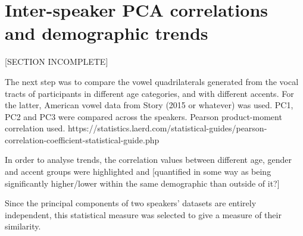 \section{Inter-speaker PCA correlations and demographic trends}

[SECTION INCOMPLETE]

The next step was to compare the vowel quadrilaterals generated from the vocal tracts of participants in different age categories, and with different accents. For the latter, American vowel data from Story (2015 or whatever) was used. PC1, PC2 and PC3 were compared across the speakers. Pearson product-moment correlation used. https://statistics.laerd.com/statistical-guides/pearson-correlation-coefficient-statistical-guide.php

In order to analyse trends, the correlation values between different age, gender and accent groups were highlighted and [quantified in some way as being significantly higher/lower within the same demographic than outside of it?]


Since the principal components of two speakers' datasets are entirely independent, this statistical measure was selected to give a measure of their similarity.